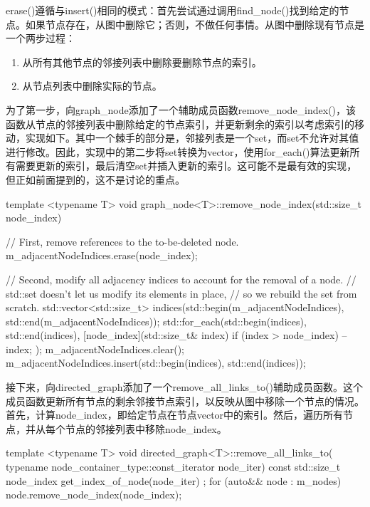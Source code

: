 erase()遵循与insert()相同的模式：首先尝试通过调用find\_node()找到给定的节点。如果节点存在，从图中删除它；否则，不做任何事情。从图中删除现有节点是一个两步过程：

\begin{enumerate}
\item
从所有其他节点的邻接列表中删除要删除节点的索引。

\item
从节点列表中删除实际的节点。
\end{enumerate}

为了第一步，向graph\_node添加了一个辅助成员函数remove\_node\_index()，该函数从节点的邻接列表中删除给定的节点索引，并更新剩余的索引以考虑索引的移动，实现如下。其中一个棘手的部分是，邻接列表是一个set，而set不允许对其值进行修改。因此，实现中的第二步将set转换为vector，使用for\_each()算法更新所有需要更新的索引，最后清空set并插入更新的索引。这可能不是最有效的实现，但正如前面提到的，这不是讨论的重点。

\begin{cpp}
template <typename T>
void graph_node<T>::remove_node_index(std::size_t node_index)
{
    // First, remove references to the to-be-deleted node.
    m_adjacentNodeIndices.erase(node_index);

    // Second, modify all adjacency indices to account for the removal of a node.
    // std::set doesn't let us modify its elements in place,
    // so we rebuild the set from scratch.
    std::vector<std::size_t> indices(std::begin(m_adjacentNodeIndices),
    std::end(m_adjacentNodeIndices));
    std::for_each(std::begin(indices), std::end(indices),
        [node_index](std::size_t& index) {
            if (index > node_index) { --index; }
        });
    m_adjacentNodeIndices.clear();
    m_adjacentNodeIndices.insert(std::begin(indices), std::end(indices));
}
\end{cpp}

接下来，向directed\_graph添加了一个remove\_all\_links\_to()辅助成员函数。这个成员函数更新所有节点的剩余邻接节点索引，以反映从图中移除一个节点的情况。首先，计算node\_index，即给定节点在节点vector中的索引。然后，遍历所有节点，并从每个节点的邻接列表中移除node\_index。

\begin{cpp}
template <typename T>
void directed_graph<T>::remove_all_links_to(
    typename node_container_type::const_iterator node_iter)
{
    const std::size_t node_index { get_index_of_node(node_iter) };
    for (auto&& node : m_nodes) { node.remove_node_index(node_index); }
}
\end{cpp}


